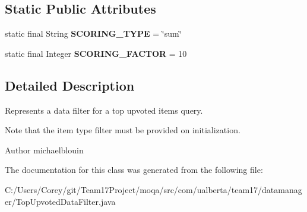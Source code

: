 \subsection*{Static Public Attributes}
\begin{DoxyCompactItemize}
\item 
\hypertarget{classcom_1_1ualberta_1_1team17_1_1datamanager_1_1_top_upvoted_data_filter_aacb9f985586fa556dd678ff1ebaf306b}{static final String {\bfseries S\+C\+O\+R\+I\+N\+G\+\_\+\+T\+Y\+P\+E} = \char`\"{}sum\char`\"{}}\label{classcom_1_1ualberta_1_1team17_1_1datamanager_1_1_top_upvoted_data_filter_aacb9f985586fa556dd678ff1ebaf306b}

\item 
\hypertarget{classcom_1_1ualberta_1_1team17_1_1datamanager_1_1_top_upvoted_data_filter_aa7d522f574c99123d2049d2cbd480b0b}{static final Integer {\bfseries S\+C\+O\+R\+I\+N\+G\+\_\+\+F\+A\+C\+T\+O\+R} = 10}\label{classcom_1_1ualberta_1_1team17_1_1datamanager_1_1_top_upvoted_data_filter_aa7d522f574c99123d2049d2cbd480b0b}

\end{DoxyCompactItemize}


\subsection{Detailed Description}
Represents a data filter for a top upvoted items query.

Note that the item type filter must be provided on initialization.

\begin{DoxyAuthor}{Author}
michaelblouin 
\end{DoxyAuthor}


The documentation for this class was generated from the following file\+:\begin{DoxyCompactItemize}
\item 
C\+:/\+Users/\+Corey/git/\+Team17\+Project/moqa/src/com/ualberta/team17/datamanager/Top\+Upvoted\+Data\+Filter.\+java\end{DoxyCompactItemize}
